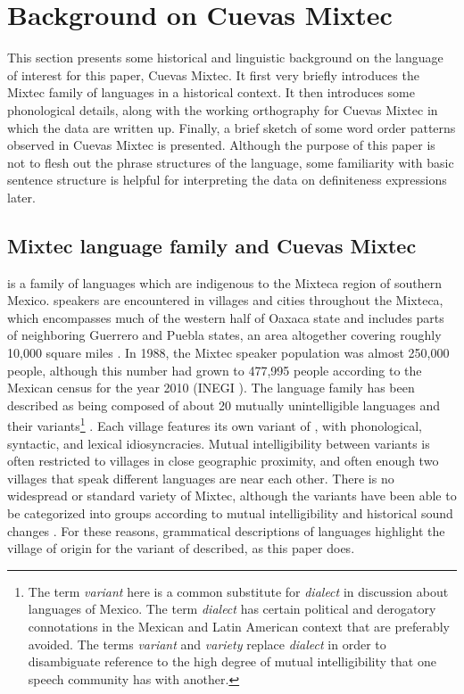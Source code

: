 \documentclass[output=paper,modfonts,nonflat]{langsci/langscibook}
\begin{document}
\section{Background on Cuevas Mixtec} \label{sec:cisneros:3}

This section presents some historical and linguistic background on the language of interest for this paper, Cuevas Mixtec.  It first very briefly introduces the Mixtec family of languages in a historical context.  It then introduces some phonological details, along with the working orthography for Cuevas Mixtec in which the data are written up.  Finally, a brief sketch of some word order patterns observed in Cuevas Mixtec is presented.  Although the purpose of this paper is not to flesh out the phrase structures of the language, some familiarity with basic sentence structure is helpful for interpreting the data on definiteness expressions later.

\subsection{Mixtec language family and Cuevas Mixtec} \label{sec:cisneros:3.1}

 is a family of languages which are indigenous to the Mixteca region of southern Mexico.   speakers are encountered in villages and cities throughout the Mixteca, which encompasses much of the western half of Oaxaca state and includes parts of neighboring Guerrero and Puebla states, an area altogether covering roughly 10,000 square miles \citep{Bradley1988}.  In 1988, the Mixtec speaker population was almost 250,000 people, although this number had grown to 477,995 people according to the Mexican census for the year 2010 (INEGI \citeyear{inegi2010}).  The language family has been described as being composed of about 20 mutually unintelligible languages and their variants\footnote{The term \emph{variant} here is a common substitute for \emph{dialect} in discussion about languages of Mexico. The term \emph{dialect} has certain political and derogatory connotations in the Mexican and Latin American context that are preferably avoided.  The terms \emph{variant} and \emph{variety} replace \emph{dialect} in order to disambiguate reference to the high degree of mutual intelligibility that one speech community has with another.} \citep{Bradley1988}.  Each village features its own variant of , with phonological, syntactic, and lexical idiosyncracies.  Mutual intelligibility between variants is often restricted to villages in close geographic proximity, and often enough two villages that speak different  languages are near each other.  There is no widespread or standard variety of Mixtec, although the variants have been able to be categorized into groups according to mutual intelligibility \citep[25--37]{Egland1978} and historical sound changes \citep{Josserand1983}.  For these reasons, grammatical descriptions of  languages highlight the village of origin for the variant of  described, as this paper does.
\end{document}
